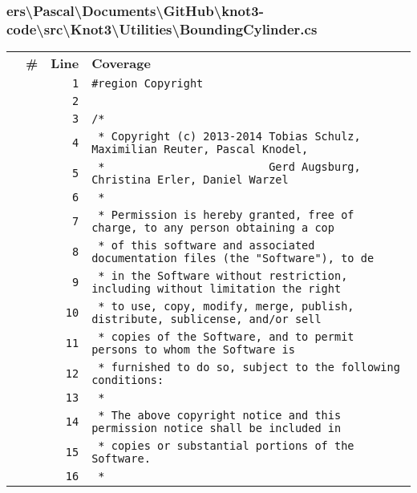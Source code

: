\documentclass[a4paper,10pt]{article}
\begin{document}
\subsubsection{ers\textbackslash Pascal\textbackslash Documents\textbackslash GitHub\textbackslash knot3-code\textbackslash src\textbackslash Knot3\textbackslash Utilities\textbackslash BoundingCylinder.cs}
\begin{longtable}[l]{lrrl}
\textbf{} & \textbf{\#} & \textbf{Line} & \textbf{Coverage}\\
\cellcolor{gray} &  & \verb~1~ & \verb~#region Copyright~\\
\cellcolor{gray} &  & \verb~2~ & \verb~~\\
\cellcolor{gray} &  & \verb~3~ & \verb~/*~\\
\cellcolor{gray} &  & \verb~4~ & \verb~ * Copyright (c) 2013-2014 Tobias Schulz, Maximilian Reuter, Pascal Knodel,~\\
\cellcolor{gray} &  & \verb~5~ & \verb~ *                         Gerd Augsburg, Christina Erler, Daniel Warzel~\\
\cellcolor{gray} &  & \verb~6~ & \verb~ *~\\
\cellcolor{gray} &  & \verb~7~ & \verb~ * Permission is hereby granted, free of charge, to any person obtaining a cop~\\
\cellcolor{gray} &  & \verb~8~ & \verb~ * of this software and associated documentation files (the "Software"), to de~\\
\cellcolor{gray} &  & \verb~9~ & \verb~ * in the Software without restriction, including without limitation the right~\\
\cellcolor{gray} &  & \verb~10~ & \verb~ * to use, copy, modify, merge, publish, distribute, sublicense, and/or sell~\\
\cellcolor{gray} &  & \verb~11~ & \verb~ * copies of the Software, and to permit persons to whom the Software is~\\
\cellcolor{gray} &  & \verb~12~ & \verb~ * furnished to do so, subject to the following conditions:~\\
\cellcolor{gray} &  & \verb~13~ & \verb~ *~\\
\cellcolor{gray} &  & \verb~14~ & \verb~ * The above copyright notice and this permission notice shall be included in ~\\
\cellcolor{gray} &  & \verb~15~ & \verb~ * copies or substantial portions of the Software.~\\
\cellcolor{gray} &  & \verb~16~ & \verb~ *~\\

\end{longtable}
\end{document}
